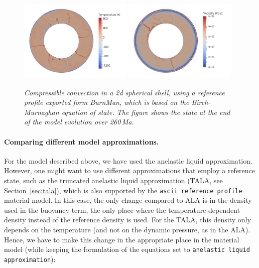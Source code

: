 \documentclass{article}
\begin{document}
\begin{figure}
  \includegraphics[width=0.48\textwidth]{cookbooks/burnman/temperature.png}
  \hfill
  \includegraphics[width=0.48\textwidth]{cookbooks/burnman/viscosity.png}
  \caption{\it Compressible convection in a 2d spherical shell, using a reference profile exported 
               form BurnMan, which is based on the Birch-Murnaghan equation of state. The figure shows the
               state at the end of the model evolution over 260\,Ma.}
  \label{fig:burnman-convection}
\end{figure}

\paragraph{Comparing different model approximations.}
For the model described above, we have used the anelastic liquid approximation. However, one might want 
to use different approximations that employ a reference state, such as the truncated anelastic liquid 
approximation (TALA, see Section~\ref{sec:tala}), which is also supported by the 
\texttt{ascii reference profile} material model. In this case, the only change compared to ALA 
is in the density used in the buoyancy term, the only place where the temperature-dependent density
instead of the reference density is used. For the TALA, this density only depends on the temperature 
(and not on the dynamic pressure, as in the ALA). Hence, we have to make this change in the appropriate 
place in the material model (while keeping the formulation of the equations set to 
\texttt{anelastic liquid approximation}):

\end{document}
